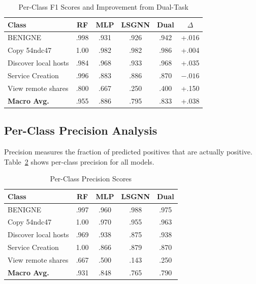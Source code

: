 \documentclass[conference]{IEEEtran}
\begin{document}
\begin{table}[t]
\centering
\caption{Per-Class F1 Scores and Improvement from Dual-Task}
\label{tab:perclass_f1}
\begin{tabular}{@{}lccccc@{}}
\toprule
\textbf{Class} & \textbf{RF} & \textbf{MLP} & \textbf{LSGNN} & \textbf{Dual} & \textbf{$\Delta$} \\
\midrule
BENIGNE              & .998 & .931 & .926 & .942 & +.016 \\
Copy 54ndc47         & 1.00 & .982 & .982 & .986 & +.004 \\
Discover local hosts & .984 & .968 & .933 & .968 & +.035 \\
Service Creation     & .996 & .883 & .886 & .870 & $-.016$ \\
View remote shares   & .800 & .667 & .250 & .400 & +.150 \\
\midrule
\textbf{Macro Avg.}  & .955 & .886 & .795 & .833 & +.038 \\
\bottomrule
\end{tabular}
\end{table}

\subsection{Per-Class Precision Analysis}

Precision measures the fraction of predicted positives that are actually positive. Table~\ref{tab:perclass_prec} shows per-class precision for all models.

\begin{table}[t]
\centering
\caption{Per-Class Precision Scores}
\label{tab:perclass_prec}
\begin{tabular}{@{}lcccc@{}}
\toprule
\textbf{Class} & \textbf{RF} & \textbf{MLP} & \textbf{LSGNN} & \textbf{Dual} \\
\midrule
BENIGNE              & .997 & .960 & .988 & .975 \\
Copy 54ndc47         & 1.00 & .970 & .955 & .963 \\
Discover local hosts & .969 & .938 & .875 & .938 \\
Service Creation     & 1.00 & .866 & .879 & .870 \\
View remote shares   & .667 & .500 & .143 & .250 \\
\midrule
\textbf{Macro Avg.}  & .931 & .848 & .765 & .790 \\
\bottomrule
\end{tabular}
\end{table}
\end{document}
